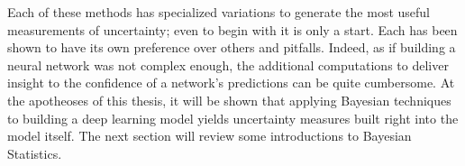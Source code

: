 Each of these methods has specialized variations to generate the most useful measurements of uncertainty; even to begin with it is only a start.  Each has been shown to have its own preference over others and pitfalls.  Indeed, as if building a neural network was not complex enough, the additional computations to deliver insight to the confidence of a network's predictions can be quite cumbersome. At the apotheoses of this thesis, it will be shown that applying Bayesian techniques to building a deep learning model yields uncertainty measures built right into the model itself.  The next section will review some introductions to Bayesian Statistics.